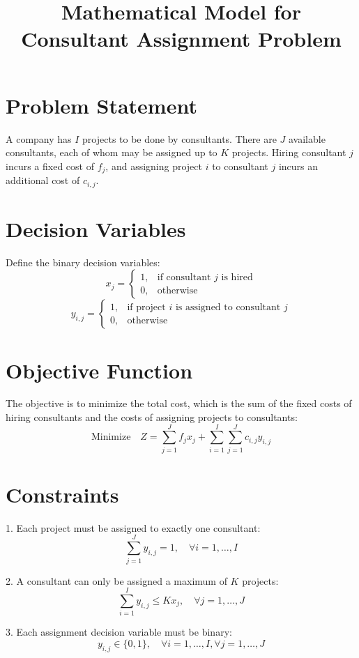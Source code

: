 \documentclass{article}
\begin{document}
\title{Mathematical Model for Consultant Assignment Problem}
\author{}
\date{}
\maketitle

\section*{Problem Statement}
A company has \( I \) projects to be done by consultants. There are \( J \) available consultants, each of whom may be assigned up to \( K \) projects. Hiring consultant \( j \) incurs a fixed cost of \( f_j \), and assigning project \( i \) to consultant \( j \) incurs an additional cost of \( c_{i,j} \).

\section*{Decision Variables}
Define the binary decision variables:
\[
x_j = 
\begin{cases}
1, & \text{if consultant } j \text{ is hired} \\
0, & \text{otherwise}
\end{cases}
\]
\[
y_{i,j} = 
\begin{cases}
1, & \text{if project } i \text{ is assigned to consultant } j \\
0, & \text{otherwise}
\end{cases}
\]

\section*{Objective Function}
The objective is to minimize the total cost, which is the sum of the fixed costs of hiring consultants and the costs of assigning projects to consultants:
\[
\text{Minimize} \quad Z = \sum_{j=1}^{J} f_j x_j + \sum_{i=1}^{I} \sum_{j=1}^{J} c_{i,j} y_{i,j}
\]

\section*{Constraints}
1. Each project must be assigned to exactly one consultant:
\[
\sum_{j=1}^{J} y_{i,j} = 1, \quad \forall i = 1, \ldots, I
\]

2. A consultant can only be assigned a maximum of \( K \) projects:
\[
\sum_{i=1}^{I} y_{i,j} \leq K x_j, \quad \forall j = 1, \ldots, J
\]

3. Each assignment decision variable must be binary:
\[
y_{i,j} \in \{0, 1\}, \quad \forall i = 1, \ldots, I, \forall j = 1, \ldots, J
\]
\end{document}
